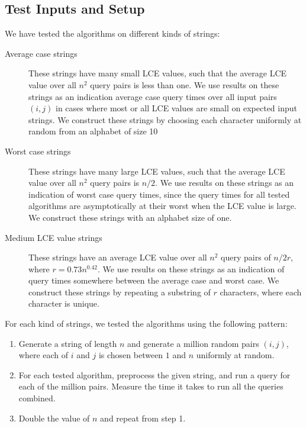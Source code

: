 \documentclass[a4]{article}
\begin{document}
\fi %

\subsection{Test Inputs and Setup}

We have tested the algorithms on different kinds of strings:
\begin{description}
\item[Average case strings] These strings have many small LCE values, such that the average LCE value over all $n^2$ query pairs is less than one. We use results on these strings as an indication average case query times over all input pairs $(i,j)$ in cases where most or all LCE values are small on expected input strings. We construct these strings by choosing each character uniformly at random from an alphabet of size 10
\item[Worst case strings] These strings have many large LCE values, such that the average LCE value over all $n^2$ query pairs is $n/2$. We use results on these strings as an indication of worst case query times, since the query times for all tested algorithms are asymptotically at their worst when the LCE value is large. We construct these strings with an alphabet size of one.
\item[Medium LCE value strings] These strings have an average LCE value over all $n^2$ query pairs of $n/2r$, where $r=0.73n^{0.42}$. We use results on these strings as an indication of query times somewhere between the average case and worst case. We construct these strings by repeating a substring of $r$ characters, where each character is unique.
\end{description}

For each kind of strings, we tested the algorithms using the following pattern:
\begin{enumerate}
\item Generate a string of length $n$ and generate a million random pairs $(i, j)$, where each of $i$ and $j$ is chosen between $1$ and $n$ uniformly at random.
\item For each tested algorithm, preprocess the given string, and run a query for each of the million pairs. Measure the time it takes to run all the queries combined.
\item Double the value of $n$ and repeat from step 1.
\end{enumerate}
\end{document}
